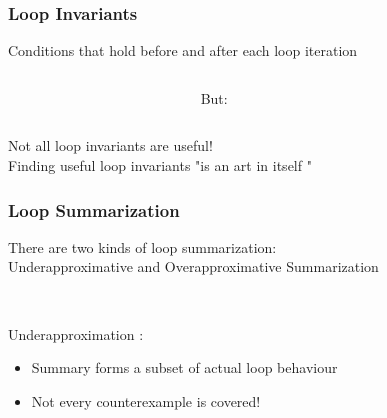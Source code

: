 \begin{frame}[t]
	\frametitle{Loop Invariants}
	\begin{center}
		\onslide<+->
		Conditions that hold before and after each loop iteration		
		\begin{columns}[c]
		\begin{column}{0.38\textwidth}
			\onslide<+->
			\begin{figure}[h]
				\vspace*{0.5cm}
				\resizebox{0.65\textwidth}{!}{}
			\end{figure}
		\end{column}
			\onslide<+->
		\begin{column}{0.05\textwidth}
				But:
		\end{column}
		\begin{column}{0.38\textwidth}
			\begin{figure}[h]
				\vspace*{0.5cm}
				\resizebox{0.65\textwidth}{!}{}
			\end{figure}
		\end{column}
	\end{columns}
	\onslide<+->
	Not all loop invariants are useful! \\
	\onslide<+->
	Finding useful loop invariants "\color{emblue}is an art in itself \color{black}" \cite{DBLP:journals/fmsd/KroeningSTTW13}
	\end{center}
\end{frame}

\begin{frame}[t]
	\frametitle{Loop Summarization}
	\begin{center}
		There are two kinds of loop summarization: \\
		\onslide<+-> \color{emblue}Underapproximative \color{black} and \color{emblue}Overapproximative \color{black} Summarization
		\begin{columns}[t]
			\begin{column}{0.35\textwidth}
				\vspace*{0.5cm} \\
				\onslide<+-> \color{emblue} Underapproximation \color{black}:
				\begin{itemize}
					\onslide<+-> \item Summary forms a subset of actual loop behaviour
					\item Not every counterexample is covered!
				\end{itemize}
			\end{column}
			\begin{column}{0.5\textwidth}
				\vspace*{0.5cm}
				\resizebox{\textwidth}{!}{}
			\end{column}
		\end{columns}
	\end{center}
\end{frame}

